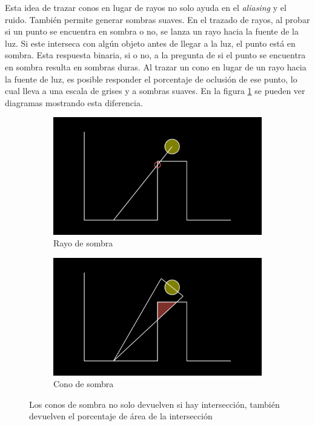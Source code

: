 Esta idea de trazar conos en lugar de rayos no solo ayuda en el \textit{aliasing} y el ruido.
También permite generar sombras suaves.
En el trazado de rayos, al probar si un punto se encuentra en sombra o no, se lanza un rayo hacia la fuente de la luz.
Si este interseca con algún objeto antes de llegar a la luz, el punto está en sombra.
Esta respuesta binaria, si o no, a la pregunta de si el punto se encuentra en sombra resulta en sombras duras.
Al trazar un cono en lugar de un rayo hacia la fuente de luz, es posible responder el porcentaje de oclusión de ese punto, lo cual lleva a una escala de grises y a sombras suaves.
En la figura \ref{fig:shadow-rays-and-cones} se pueden ver diagramas mostrando esta diferencia.

\begin{figure}
    \begin{center}
    \begin{subfigure}{.49\textwidth}
        \includegraphics[width=\textwidth]{shadow-ray-diagram}
        \caption{Rayo de sombra}
    \end{subfigure}
    \begin{subfigure}{.49\textwidth}
        \includegraphics[width=\textwidth]{shadow-cone-diagram}
        \caption{Cono de sombra}
    \end{subfigure}
    \caption{Los conos de sombra no solo devuelven si hay intersección, también devuelven el porcentaje de área de la intersección}
    \label{fig:shadow-rays-and-cones}
    \end{center}
\end{figure}

